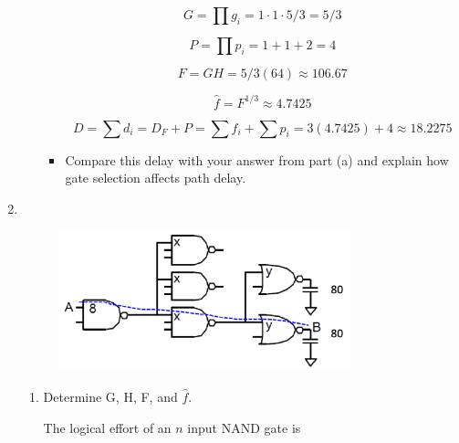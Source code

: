 \documentclass[fleqn]{article}
\begin{document}
\begin{enumerate}
\begin{enumerate}
\begin{itemize}
				\begin{equation*}
					G = \prod{g_i} = 1 \cdot 1 \cdot 5/3 = 5/3
				\end{equation*}
				
				\begin{equation*}
					P = \prod{p_i} = 1 + 1 + 2 = 4
				\end{equation*}
				
				\begin{equation*}
					F = GH = 5/3(64) \approx 106.67
				\end{equation*}
				
				\begin{equation*}
					\hat{f} = F^{1/3} \approx 4.7425
				\end{equation*}
				
				\begin{equation*}
					D = \sum{d_i} = D_F + P = \sum{f_i} + \sum{p_i} = 3(4.7425) + 4 \approx \mathbf{18.2275}
				\end{equation*}
				
				\item Compare this delay with your answer from part (a) and explain how gate selection affects path delay.
				
			\end{itemize}
		\end{enumerate}
		
		\item ~
		
			\begin{figure}[H]				
			\centerline{\includegraphics[width=0.8\textwidth]{circuit_question5.png}}
			\label{fig::circuit_question5}
			\end{figure}
		
			\begin{enumerate}
				\item Determine G, H, F, and $\hat{f}$.
				
				The logical effort of an $n$ input NAND gate is
				

\end{enumerate}
\end{enumerate}
\end{document}
